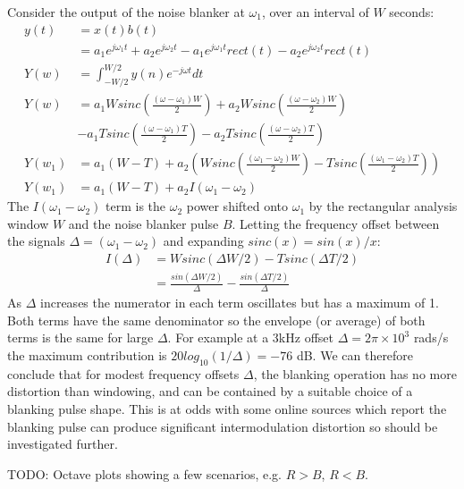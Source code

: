 \documentclass{article}
\begin{document}
Consider the output of the noise blanker at $\omega_1$, over an interval of $W$ seconds:
\begin{equation}
\begin{split}
y(t) &= x(t)b(t) \\
     &= a_1 e^{j \omega_1 t} + a_2 e^{j \omega_2 t} - a_1 e^{j \omega_1 t}rect(t) - a_2 e^{j \omega_2 t}rect(t) \\
Y(w) &= \int_{-W/2}^{W/2} y(n) e^{-j \omega t} dt \\    
Y(w) &= a_1 W sinc \left( \frac{(\omega-\omega_1)W}{2} \right) + a_2 W sinc \left( \frac{(\omega-\omega_2)W}{2}  \right)\\
     &- a_1 T sinc \left( \frac{(\omega-\omega_1)T}{2} \right) - a_2 T sinc \left( \frac{(\omega-\omega_2)T}{2} \right) \\
Y(w_1) &= a_1(W-T) + a_2 \left( W sinc \left( \frac{(\omega_1-\omega_2)W}{2} \right) - T sinc \left( \frac{(\omega_1-\omega_2)T}{2} \right) \right) \\
Y(w_1) &= a_1(W-T) + a_2 I(\omega_1-\omega_2)
\end{split}
\end{equation} 
The $I(\omega_1-\omega_2)$ term is the $\omega_2$ power shifted onto $\omega_1$ by the rectangular analysis window $W$ and the noise blanker pulse $B$.  Letting the frequency offset between the signals $\Delta = (\omega_1-\omega_2)$ and expanding $sinc(x) = sin(x)/x$:
\begin{equation}
\begin{split}
I(\Delta) &= W sinc (\Delta W/2) - T sinc (\Delta T/2) \\
&= \frac{sin (\Delta W/2)}{\Delta} - \frac{sin (\Delta T/2)}{\Delta}
\end{split}
\end{equation} 
As $\Delta$ increases the numerator in each term oscillates but has a maximum of 1.  Both terms have the same denominator so the envelope (or average) of both terms is the same for large $\Delta$.  For example at a 3kHz offset $\Delta = 2 \pi \times 10^3 $ rads/s the maximum contribution is $20log_{10}(1/\Delta) = -76$ dB. We can therefore conclude that for modest frequency offsets $\Delta$, the blanking operation has no more distortion than windowing, and can be contained by a suitable choice of a blanking pulse shape. This is at odds with some online sources which report the blanking pulse can produce significant intermodulation distortion so should be investigated further.

TODO: Octave plots showing a few scenarios, e.g. $R>B$, $R<B$.



\end{document}

